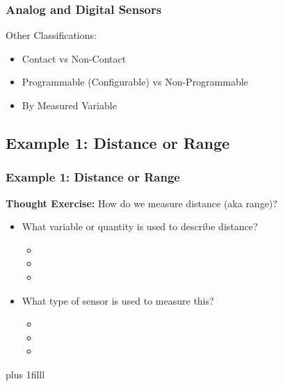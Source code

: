 \documentclass[fleqn]{beamer} %
\newcommand{\sectionIsubsectionItitle}{Analog and Digital Sensors}
\newcommand{\sectionIsubsectionIItitle}{Example 1: Distance or Range}
\newcommand{\btVFill}{\vskip0pt plus 1filll}
\begin{document}
			\begin{frame}
				\frametitle{\sectionIsubsectionItitle}

				Other Classifications:
				\begin{itemize}
					\item Contact vs Non-Contact

					\item Programmable (Configurable) vs Non-Programmable

					\item By Measured Variable	

				\end{itemize}


			\end{frame}

		\subsection{\sectionIsubsectionIItitle}\label{sectionIsubsectionII}

			\begin{frame}
				\frametitle{\sectionIsubsectionIItitle}

				{\bf Thought Exercise:} How do we measure {\BL distance} (aka range)?        
	
					\begin{itemize}
					
						\item What variable or quantity is used to describe {\BL distance}?                         
						\begin{itemize}
							\item
							\item
							\item	
						\end{itemize} \vspace{5mm}
						\item What type of sensor is used to measure this?
						\begin{itemize}
							\item
							\item
							\item	
						\end{itemize}	

					\end{itemize}
				
				\btVFill

			\end{frame}
\end{document}
